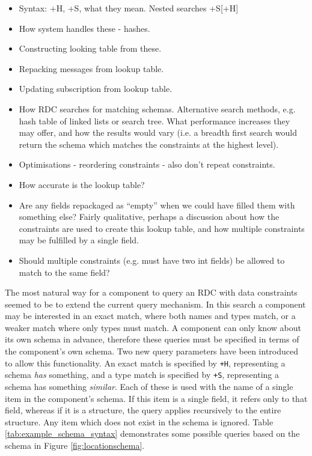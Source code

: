 \documentclass[12pt,twoside,notitlepage]{report}
\begin{document}
\begin{itemize}

\item Syntax: +H, +S, what they mean. Nested searches +S[+H]

\item How system handles these - hashes. 

\item Constructing looking table from these.

\item Repacking messages from lookup table.

\item Updating subscription from lookup table.

\item How RDC searches for matching schemas. Alternative search methods, e.g. hash table of linked lists or search tree. What performance increases they may offer, and how the results would vary (i.e. a breadth first search would return the schema which matches the constraints at the highest level).

\item Optimisations - reordering constraints - also don't repeat constraints.

\item How accurate is the lookup table? 
\item Are any fields repackaged as ``empty'' when we could have filled them with something else? Fairly qualitative, perhaps a discussion about how the constraints are used to create this lookup table, and how multiple constraints may be fulfilled by a single field.

\item Should multiple constraints (e.g. must have two int fields) be allowed to match to the same field?

\end{itemize}

The most natural way for a component to query an RDC with data constraints seemed to be to extend the current query mechanism. 
In this search a component may be interested in an exact match, where both names and types match, or a weaker match where only types must match. 
A component can only know about its own schema in advance, therefore these queries must be specified in terms of the component's own schema.
Two new query parameters have been introduced to allow this functionality. 
An exact match is specified by {\tt +H}, representing a schema {\sl has} something, and a type match is specified by {\tt +S}, representing a schema has something {\sl similar}.
Each of these is used with the name of a single item in the component's schema.
If this item is a single field, it refers only to that field, whereas if it is a structure, the query applies recursively to the entire structure. 
Any item which does not exist in the schema is ignored. 
Table \ref{tab:example_schema_syntax} demonstrates some possible queries based on the schema in Figure \ref{fig:locationschema}.
\end{document}
